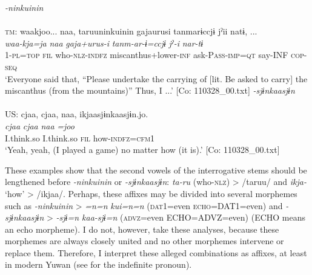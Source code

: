 \ea  \label{ex:4.55}
\ea  \textit{{}-ninkuinin} \label{ex:4.55a}\\\\
    \textsc{tm}:
     \glll waakjoo...  naa,  taruuninkuinin  gajaurusi   tanmarɨccjɨ  jˀii  natɨ, ...\\
      \textit{waa-kja=ja}  \textit{naa}  \textit{}  \textit{gaja+urus-i} \textit{tanm-ar-ɨ=ccjɨ}  \textit{jˀ-i}  \textit{nar-tɨ}\\                                                                                        
      1-\textsc{pl}=\textsc{top}  \textsc{fil}  who-\textsc{nlz}-\textsc{indfz}  miscanthus+lower-\textsc{inf}                                ask-P\textsc{ass}-\textsc{imp}=\textsc{qt}  say-INF  \textsc{cop}-\textsc{seq}\\
      \glt ‘Everyone said that, “Please undertake the carrying of [lit. Be asked to carry] the miscanthus (from the mountains)” Thus, I ...’   [Co: 110328\_00.txt]
\ex  \textit{{}-sjɨnkaasjɨn}\\\\
US: \glll     cjaa,  cjaa,  naa,  ikjaasjɨnkaasjɨn.jo.\\
      \textit{cjaa}  \textit{cjaa}  \textit{naa}  \textit{=joo}\\
      I.think.so  I.think.so  \textsc{fil}  how-\textsc{indfz}=\textsc{cfm}1\\
      \glt       ‘Yeah, yeah, (I played a game) no matter how (it is).’ [Co: 110328\_00.txt]
    \z
\z

These examples show that the second vowels of the interrogative stems should be lengthened before \textit{{}-ninkuinin} or \textit{{}-sjɨnkaasjɨn}: \textit{ta-ru} (who-\textsc{nlz}) > /taruu/ and \textit{ikja-} ‘how’ > /ikjaa/. Perhaps, these affixes may be divided into several morphemes such as \textit{{}-ninkuinin} > \textit{=n=n} \textit{kui=n=n} (\textsc{dat}1=even \textsc{echo}=DAT1=even) and \textit{{}-sjɨnkaasjɨn} > \textit{{}-sjɨ=n kaa-sjɨ=n} (\textsc{advz}=even ECHO=ADVZ=even) (ECHO means an echo morpheme). I do not, however, take these analyses, because these morphemes are always closely united and no other morphemes intervene or replace them. Therefore, I interpret these alleged combinations as affixes, at least in modern Yuwan (see  for the indefinite pronoun).

